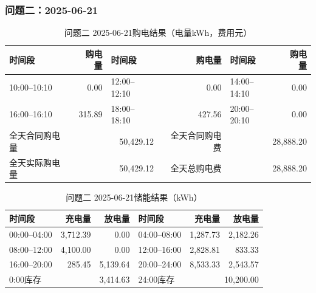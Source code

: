 \par\medskip
\par\noindent\begin{minipage}{\textwidth}
\subsubsection*{问题二：2025-06-21}
\begin{table}[H]\centering\small\setlength{\tabcolsep}{4pt}\caption{问题二 2025-06-21购电结果（电量kWh，费用元）}
\begin{tabular}{lr lr lr}\toprule
时间段 & 购电量 & 时间段 & 购电量 & 时间段 & 购电量\\\midrule
10:00--10:10 & 0.00 & 12:00--12:10 & 0.00 & 14:00--14:10 & 0.00\\
16:00--16:10 & 315.89 & 18:00--18:10 & 427.56 & 20:00--20:10 & 0.00\\
\midrule
全天合同购电量 & \multicolumn{2}{r}{50,429.12} & 全天合同购电费 & \multicolumn{2}{r}{28,888.20}\\
全天实际购电量 & \multicolumn{2}{r}{50,429.12} & 全天总购电费 & \multicolumn{2}{r}{28,888.20}\\
\bottomrule\end{tabular}\end{table}
\begin{table}[H]\centering\small\setlength{\tabcolsep}{4pt}\caption{问题二 2025-06-21储能结果（kWh）}
\begin{tabular}{lrr lrr}\toprule
时间段 & 充电量 & 放电量 & 时间段 & 充电量 & 放电量\\\midrule
00:00--04:00 & 3,712.39 & 0.00 & 04:00--08:00 & 1,287.73 & 2,182.26\\
08:00--12:00 & 4,100.00 & 0.00 & 12:00--16:00 & 2,828.81 & 833.33\\
16:00--20:00 & 285.45 & 5,139.64 & 20:00--24:00 & 8,533.33 & 2,543.57\\
\midrule
0:00库存 & \multicolumn{2}{r}{3,414.63} & 24:00库存 & \multicolumn{2}{r}{10,200.00}\\
\bottomrule\end{tabular}\end{table}
\end{minipage}\par

